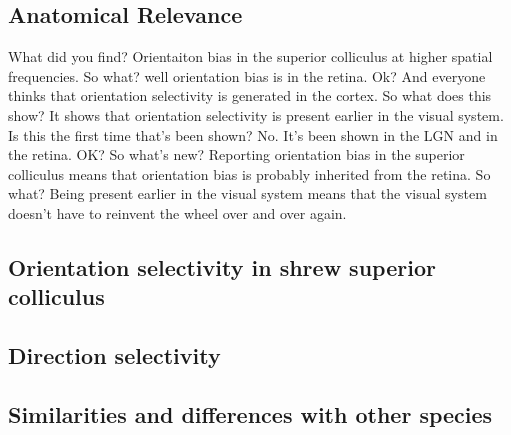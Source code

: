 				
		
	
	\subsection{Anatomical Relevance}
	
	What did you find?
	Orientaiton bias in the superior colliculus at higher spatial frequencies.
	So what?
	well orientation bias is in the retina.
	Ok?
	And everyone thinks that orientation selectivity is generated in the cortex.
	So what does this show?
	It shows that orientation selectivity is present earlier in the visual system. 
	Is this the first time that's been shown?
	No. It's been shown in the LGN and in the retina.
	OK? So what's new?
	Reporting orientation bias in the superior colliculus means that orientation bias is probably inherited from the retina.
	So what?
	Being present earlier in the visual system means that the visual system doesn't have to reinvent the wheel over and over again.
	
	\subsection{Orientation selectivity in shrew superior colliculus}
	\subsection{Direction selectivity}
	\subsection{Similarities and differences with other species}
	